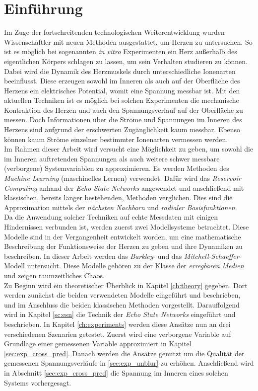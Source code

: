 \chapter{Einführung}
Im Zuge der fortschreitenden technologischen Weiterentwicklung wurden Wissenschaftler mit neuen Methoden ausgestattet, um Herzen zu untersuchen. So ist es möglich bei sogenannten \textit{in vitro} Experimenten ein Herz außerhalb des eigentlichen Körpers schlagen zu lassen, um sein Verhalten studieren zu können. Dabei wird die Dynamik des Herzmuskels durch unterschiedliche Ionenarten beeinflusst. Diese erzeugen sowohl im Inneren als auch auf der Oberfläche des Herzens ein elektrisches Potential, womit eine Spannung messbar ist. Mit den aktuellen Techniken ist es möglich bei solchen Experimenten die mechanische Kontraktion des Herzen und auch den Spannungsverlauf auf der Oberfläche zu messen. Doch Informationen über die Ströme und Spannungen im Inneren des Herzens sind aufgrund der erschwerten Zugänglichkeit kaum messbar. Ebenso können kaum Ströme einzelner bestimmter Ionenarten vermessen werden. \\

Im Rahmen dieser Arbeit wird versucht eine Möglichkeit zu geben, um sowohl die im Inneren auftretenden Spannungen als auch weitere schwer messbare (verborgene) Systemvariablen zu approximieren. Es werden Methoden des \textit{Machine Learning} (maschinelles Lernen) verwendet. Dafür wird das \textit{Reservoir Computing} anhand der \textit{Echo State Networks} angewendet und anschließend mit klassischen, bereits länger bestehenden, Methoden verglichen. Dies sind die Approximation mittels der \textit{nächsten Nachbarn} und \textit{radialer Basisfunktionen}.\\
  
Da die Anwendung solcher Techniken auf echte Messdaten mit einigen Hindernissen verbunden ist, werden zuerst zwei Modellsysteme betrachtet. Diese Modelle sind in der Vergangenheit entwickelt worden, um eine mathematische Beschreibung der Funktionsweise der Herzen zu geben und ihre Dynamiken zu beschreiben. In dieser Arbeit werden das \textit{Barkley}- und das \textit{Mitchell-Schaeffer}-Modell untersucht. Diese Modelle gehören zu der Klasse der \textit{erregbaren Medien} und zeigen raumzeitliches Chaos.\\

Zu Beginn wird ein theoretischer Überblick in Kapitel \ref{ch:theory} gegeben. Dort werden zunächst die beiden verwendeten Modelle eingeführt und beschrieben, und im Anschluss die beiden klassischen Methoden vorgestellt. Darauffolgend wird in Kapitel \ref{sc:esn} die Technik der \textit{Echo State Networks} eingeführt und beschrieben. In Kapitel \ref{ch:experiments} werden diese Ansätze nun an drei verschiedenen Szenarien getestet. Zuerst wird eine verborgene Variable auf Grundlage einer gemessenen Variable approximiert in Kapitel \ref{sec:exp_cross_pred}. Danach werden die Ansätze genutzt um die Qualität der gemessenen Spannungsverläufe in \ref{sec:exp_unblur} zu erhöhen. Anschließend wird in Abschnitt \ref{sec:exp_cross_pred} die Spannung im Inneren eines solchen Systems vorhergesagt.\\


